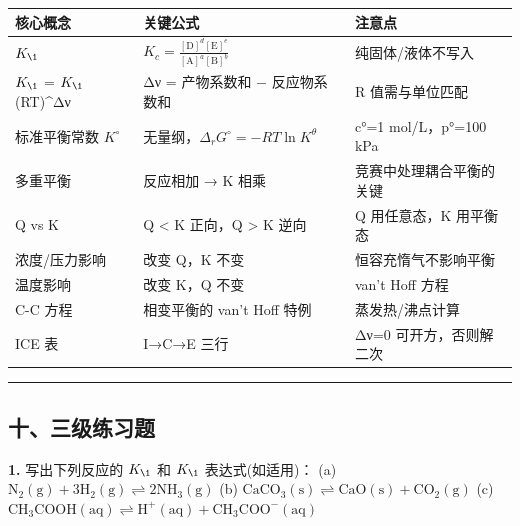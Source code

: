 \documentclass[a4paper,11pt]{ctexart}
\newcounter{none}
\begin{document}
{\def\LTcaptype{none} %
\begin{longtable}[]{@{}
  >{\raggedright\arraybackslash}p{}
  >{\raggedright\arraybackslash}p{}
  >{\raggedright\arraybackslash}p{}@{}}
\toprule\noalign{}
\begin{minipage}[b]{\linewidth}\raggedright
核心概念
\end{minipage} & \begin{minipage}[b]{\linewidth}\raggedright
关键公式
\end{minipage} & \begin{minipage}[b]{\linewidth}\raggedright
注意点
\end{minipage} \\
\midrule\noalign{}
\endhead
\bottomrule\noalign{}
\endlastfoot
\(K_{\1}\) & \(K_c = \frac{[\mathrm{D}]^d[\mathrm{E}]^e}{[\mathrm{A}]^a[\mathrm{B}]^b}\) & 纯固体/液体不写入 \\
\(K_{\1}\) = \(K_{\1}\)(RT)\^{}Δν & Δν = 产物系数和 − 反应物系数和 & R 值需与单位匹配 \\
标准平衡常数 \(K^{\circ}\) & 无量纲，\(\Delta_rG^\circ = -RT\ln K^\theta\) & c°=1 mol/L，p°=100 kPa \\
多重平衡 & 反应相加 → K 相乘 & 竞赛中处理耦合平衡的关键 \\
Q vs K & Q \textless{} K 正向，Q \textgreater{} K 逆向 & Q 用任意态，K 用平衡态 \\
浓度/压力影响 & 改变 Q，K 不变 & 恒容充惰气不影响平衡 \\
温度影响 & 改变 K，Q 不变 & van't Hoff 方程 \\
C-C 方程 & 相变平衡的 van't Hoff 特例 & 蒸发热/沸点计算 \\
ICE 表 & I→C→E 三行 & Δν=0 可开方，否则解二次 \\
\end{longtable}
}

\begin{center}\rule{0.5\linewidth}{0.5pt}\end{center}

\subsection{十、三级练习题}\label{ux5341ux4e09ux7ea7ux7ec3ux4e60ux9898}

\textbf{1.} 写出下列反应的 \(K_{\1}\) 和 \(K_{\1}\) 表达式(如适用)：
(a) \(\mathrm{N_2(g) + 3H_2(g) \rightleftharpoons 2NH_3(g)}\)
(b) \(\mathrm{CaCO_3(s) \rightleftharpoons CaO(s) + CO_2(g)}\)
(c) \(\mathrm{CH_3COOH(aq) \rightleftharpoons H^+(aq) + CH_3COO^-(aq)}\)
\end{document}
